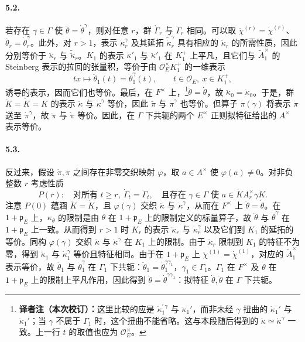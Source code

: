 \paragraph*{5.2.}若存在 $\gamma\in\Gamma$ 使 $\ddot\theta=\dot\theta^\gamma$，则对任意 $r$，群 $\dot\Gamma_r$ 与 $\ddot\Gamma_r$ 相同。可以取 $\ddot\chi^{(r)}=\dot\chi^{(r)}$、$\ddot\theta_r=\dot\theta_r^\gamma$。此外，对 $r>1$，表示 $\dot\kappa_r^\gamma$ 及其延拓 $\widetilde{\dot\kappa}_r^\gamma$ 具有相应的 $\ddot\kappa_r$ 的所需性质，因此分别等价于 $\ddot\kappa_r$ 与 $\widetilde{\ddot\kappa}_r$。$K_1$ 的表示 $\dot\kappa'_1$ 与 $\ddot\kappa'_1$ 在 $K_1^+$ 上平凡，且它们与 $\widetilde A_1^\times$ 的 Steinberg 表示的拉回的张量积，等价于由 $\mathcal O_E^\times K_1^+$ 的一维表示
\[
tx\longmapsto\ddot\theta_1(t)=\dot\theta_1^\gamma(t),\qquad t\in\mathcal O_E,\ x\in K_1^+,
\]
诱导的表示，因而它们也等价。最后，在 $F^\times$ 上，\footnote{\textbf{译者注（本次校订）：}这里比较的应是 $\dot\kappa_1^{\prime\,\gamma}$ 与 $\ddot\kappa_1'$，而非未经 $\gamma$ 扭曲的 $\dot\kappa_1'$ 与 $\ddot\kappa_1'$；当 $\gamma$ 不属于 $\Gamma_1$ 时，这个扭曲不能省略。这与本段随后得到的 $\ddot\kappa\simeq\dot\kappa^\gamma$ 一致。上一行 $t$ 的取值也应为 $\mathcal O_E^\times$。}$\ddot\theta=\dot\theta$，故 $\ddot\kappa_0=\dot\kappa_0$。于是，群 $\ddot K=\dot K=K$ 的表示 $\ddot\kappa$ 与 $\dot\kappa^\gamma$ 等价，因此 $\ddot\pi$ 与 $\dot\pi^\gamma$ 也等价。但算子 $\dot\pi(\gamma)$ 将表示 $\dot\pi$ 送至 $\dot\pi^\gamma$，故 $\ddot\pi$ 与 $\dot\pi$ 等价。因此，在 $\Gamma$ 下共轭的两个 $E^\times$ 正则拟特征给出的 $A^\times$ 表示等价。
\paragraph*{5.3.}反过来，假设 $\dot\pi,\ddot\pi$ 之间存在非零交织映射 $\varphi$，取 $a\in A^\times$ 使 $\varphi(a)\ne0$。对非负整数 $r$ 考虑性质
\[
P(r):\quad\text{对所有 }t\geq r,\ \dot\Gamma_t=\ddot\Gamma_t,\quad
\text{且存在 }\gamma\in\Gamma\text{ 使 }a\in\dot K A_r^\times\gamma\ddot K.
\]
注意 $P(0)$ 蕴涵 $\ddot K=\dot K$，且 $\varphi(\gamma)$ 交织 $\ddot\kappa$ 与 $\dot\kappa^\gamma$，从而在 $F^\times$ 上 $\ddot\theta=\dot\theta$。在 $1+\mathfrak p_E$ 上，$\kappa_\theta$ 的限制是由 $\theta$ 在 $1+\mathfrak p_E$ 上的限制定义的标量算子，故 $\ddot\theta$ 与 $\dot\theta^\gamma$ 在 $1+\mathfrak p_E$ 上一致。从而得到 $r>1$ 时 $K_r$ 的表示 $\ddot\kappa_r$ 与 $\dot\kappa_r^\gamma$ 以及它们到 $K_1$ 的延拓的等价。同构 $\varphi(\gamma)$ 交织 $\ddot\kappa$ 与 $\dot\kappa^\gamma$ 在 $K_1$ 上的限制。由于 $\ddot\kappa_r$ 限制到 $K_1$ 的特征不为零，得到 $\ddot\kappa_1$ 与 $\dot\kappa_1^\gamma$ 等价且特征相同。由于在 $1+\mathfrak p_E$ 上 $\ddot\chi^{(1)}=\dot\chi^{(1)}$，对应的 $\widetilde A_1^\times$ 表示等价，故 $\ddot\theta_1$ 与 $\dot\theta_1^\gamma$ 在 $\Gamma_1$ 下共轭：$\ddot\theta_1=\dot\theta_1^{\gamma\gamma_1}$，$\gamma_1\in\Gamma_1$。$\Gamma_1$ 在 $F^\times$ 及 $\dot\theta$ 在 $1+\mathfrak p_E$ 上的限制上平凡作用，因此得到 $\ddot\theta=\dot\theta^{\gamma\gamma_1}$：拟特征 $\dot\theta,\ddot\theta$ 在 $\Gamma$ 下共轭。

